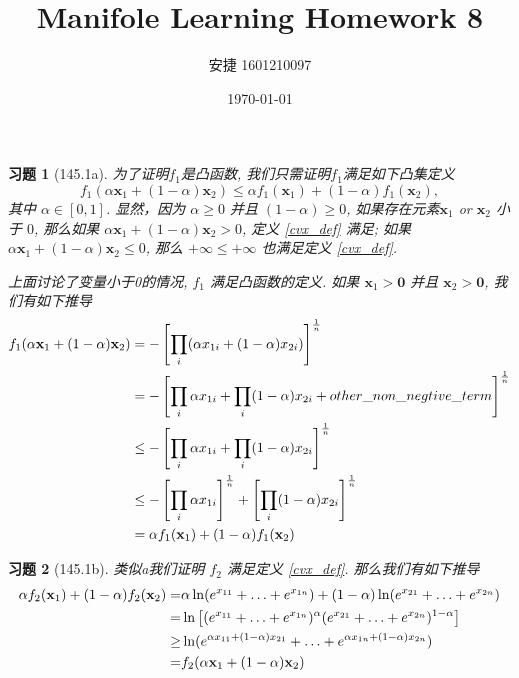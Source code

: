 \documentclass[a4paper, UTF8]{ctexart}
\title{Manifole Learning Homework 8}
\date{\today}
\author{安捷 1601210097}
\newtheorem*{exercise}{\textbf{习题}}
\begin{document}
\maketitle
	\begin{exercise}[145.1a]
		为了证明$f_1$是凸函数, 我们只需证明$f_1$满足如下凸集定义 
		\begin{equation} \label{cvx_def}
		f_1(\alpha \mathbf{x}_1 + (1 - \alpha) \mathbf{x}_2) \leq \alpha f_1(\mathbf{x}_1) + (1 - \alpha) f_1(\mathbf{x}_2),
		\end{equation}
		其中 $\alpha \in [0, 1] $. 显然，因为 $\alpha \geq 0$ 并且 $(1 - \alpha) \geq 0$, 如果存在元素$\mathbf{x}_1$ or $\mathbf{x}_2$ 小于 $0$, 那么如果 $\alpha \mathbf{x}_1 + (1 - \alpha) \mathbf{x}_2 > 0$, 定义 \ref{cvx_def} 满足; 如果 $\alpha \mathbf{x}_1 + (1 - \alpha) \mathbf{x}_2 \leq 0$, 那么 $+\infty \leq +\infty$ 也满足定义 \ref{cvx_def}.

		上面讨论了变量小于0的情况, $f_1$ 满足凸函数的定义. 如果 $\mathbf{x}_1 > \mathbf{0}$ 并且 $\mathbf{x}_2 > \mathbf{0}$, 我们有如下推导
		\begin{equation}
		\notag
		\begin{split}
		f_1(\alpha \mathbf{x}_1 + (1 - \alpha) \mathbf{x}_2) & = -\left[\prod_i (\alpha x_{1i} + (1 - \alpha) x_{2i})\right]^{\frac{1}{n}} \\
		& = -\left[\prod_i \alpha x_{1i} + \prod_i (1 - \alpha) x_{2i} + other\_non\_negtive\_term \right]^{\frac{1}{n}} \\
		& \leq -\left[\prod_i \alpha x_{1i} + \prod_i (1 - \alpha) x_{2i}\right]^{\frac{1}{n}} \\
		& \leq -\left[\prod_i \alpha x_{1i}\right]^{\frac{1}{n}} + \left[\prod_i (1 - \alpha) x_{2i}\right]^{\frac{1}{n}} \\
		& = \alpha f_1(\mathbf{x}_1) + (1 - \alpha) f_1(\mathbf{x}_2)
		\end{split}
		\end{equation}
	\end{exercise}

	\begin{exercise}[145.1b]
		类似a我们证明 $f_2$ 满足定义 \ref{cvx_def}. 那么我们有如下推导
		\begin{equation}
		\notag
		\begin{split}
		\alpha f_2(\mathbf{x}_1) + (1 - \alpha) f_2(\mathbf{x}_2) = & \alpha \ln(e^{x_{11}} + \ldots + e^{x_{1n}}) + (1 - \alpha) \ln(e^{x_{21}} + \ldots + e^{x_{2n}}) \\
		= & \ln \left[(e^{x_{11}} + \ldots + e^{x_{1n}})^\alpha (e^{x_{21}} + \ldots + e^{x_{2n}})^{1 - \alpha}\right] \\
		\ge & \ln(e^{\alpha x_{11} + (1 - \alpha) x_{21}} + \ldots + e^{\alpha x_{1n} + (1 - \alpha) x_{2n}}) \\
		= & f_2(\alpha \mathbf{x}_1 + (1 - \alpha) \mathbf{x}_2)
		\end{split}
		\end{equation}
	\end{exercise}
\end{document}
